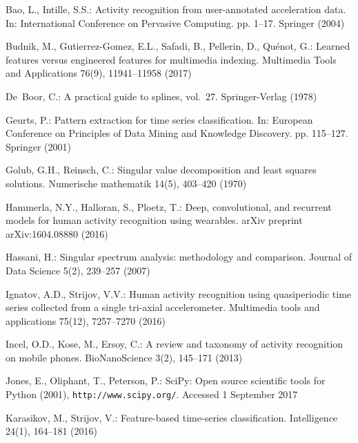 

\begin{thebibliography}{10}
	\providecommand{\url}[1]{\texttt{#1}}
	\providecommand{\urlprefix}{URL }
	
	Bao, L., Intille, S.S.: Activity recognition from user-annotated acceleration
	data. In: International Conference on Pervasive Computing. pp. 1--17.
	Springer (2004)
	
	Budnik, M., Gutierrez-Gomez, E.L., Safadi, B., Pellerin, D., Qu{\'e}not, G.:
	Learned features versus engineered features for multimedia indexing.
	Multimedia Tools and Applications  76(9),  11941--11958 (2017)
	
	De~Boor, C.: A practical guide to splines, vol.~27. Springer-Verlag (1978)
	
	Geurts, P.: Pattern extraction for time series classification. In: European
	Conference on Principles of Data Mining and Knowledge Discovery. pp.
	115--127. Springer (2001)
	
	Golub, G.H., Reinsch, C.: Singular value decomposition and least squares
	solutions. Numerische mathematik  14(5),  403--420 (1970)
	
	Hammerla, N.Y., Halloran, S., Ploetz, T.: Deep, convolutional, and recurrent
	models for human activity recognition using wearables. arXiv preprint
	arXiv:1604.08880  (2016)
	
	Hassani, H.: Singular spectrum analysis: methodology and comparison. Journal of
	Data Science  5(2),  239--257 (2007)
	
	Ignatov, A.D., Strijov, V.V.: Human activity recognition using quasiperiodic
	time series collected from a single tri-axial accelerometer. Multimedia tools
	and applications  75(12),  7257--7270 (2016)
	
	Incel, O.D., Kose, M., Ersoy, C.: A review and taxonomy of activity recognition
	on mobile phones. BioNanoScience  3(2),  145--171 (2013)
	
	Jones, E., Oliphant, T., Peterson, P.: {SciPy}: Open source scientific tools
	for {Python} (2001), \url{http://www.scipy.org/}. Accessed 1 September 2017
	
	Karasikov, M., Strijov, V.: Feature-based time-series classification.
	Intelligence  24(1),  164--181 (2016)
	

\end{thebibliography}
